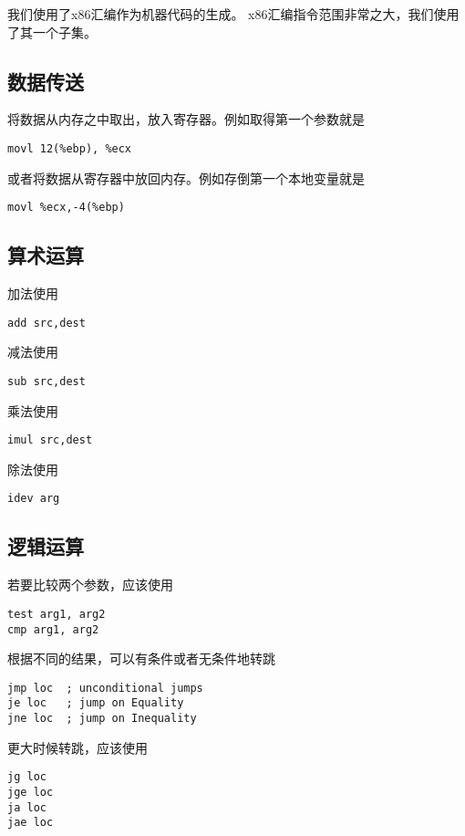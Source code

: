 ﻿\documentclass{article}
\begin{document}
我们使用了x86汇编作为机器代码的生成。
x86汇编指令范围非常之大，我们使用了其一个子集。

\subsection{数据传送}
将数据从内存之中取出，放入寄存器。例如取得第一个参数就是
\begin{lstlisting}
movl 12(%ebp), %ecx
\end{lstlisting}

或者将数据从寄存器中放回内存。例如存倒第一个本地变量就是
\begin{lstlisting}
movl %ecx,-4(%ebp)
\end{lstlisting}

\subsection{算术运算}

加法使用
\begin{lstlisting}
add src,dest
\end{lstlisting}

减法使用
\begin{lstlisting}
sub src,dest
\end{lstlisting}

乘法使用
\begin{lstlisting}
imul src,dest
\end{lstlisting}

除法使用
\begin{lstlisting}
idev arg
\end{lstlisting}


\subsection{逻辑运算}

若要比较两个参数，应该使用
\begin{lstlisting}
test arg1, arg2
cmp arg1, arg2
\end{lstlisting}

根据不同的结果，可以有条件或者无条件地转跳
\begin{lstlisting}
jmp loc  ; unconditional jumps
je loc   ; jump on Equality
jne loc  ; jump on Inequality
\end{lstlisting}

更大时候转跳，应该使用
\begin{lstlisting}
jg loc
jge loc
ja loc
jae loc
\end{lstlisting}
\end{document}
